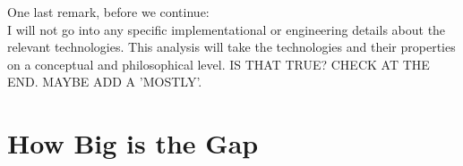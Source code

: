 \documentclass{article}
\newcounter{example}
\begin{document}
One last remark, before we continue:\\

I will not go into any specific implementational or engineering details about
the relevant technologies. This analysis will take the technologies and their
properties on a conceptual and philosophical level. IS THAT TRUE? CHECK AT THE
END. MAYBE ADD A 'MOSTLY'.
%
%
%
%
%
%
%


\section{How Big is the Gap}
\end{document}
